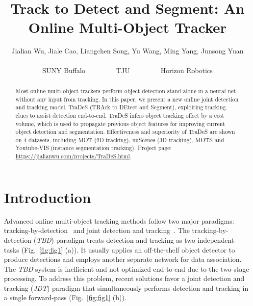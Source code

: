 \documentclass[final]{cvpr}
\begin{document}
\title{Track to Detect and Segment: An Online Multi-Object Tracker}
\author{Jialian Wu, Jiale Cao, Liangchen Song, Yu Wang, Ming Yang, Junsong Yuan\\\\
	SUNY Buffalo~~~~~~~~~TJU~~~~~~~~~Horizon Robotics
}

\maketitle
\begin{abstract}
Most online multi-object trackers perform object detection stand-alone in a neural net without any input from tracking. In this paper, we present a new online joint detection and tracking model, TraDeS (TRAck to DEtect and Segment), exploiting tracking clues to assist detection end-to-end. TraDeS infers object tracking offset by a cost volume, which is used to propagate previous object features for improving current object detection and segmentation. Effectiveness and superiority of TraDeS are shown on 4 datasets, including MOT (2D tracking), nuScenes (3D tracking), MOTS and Youtube-VIS (instance segmentation tracking). Project page: \url{https://jialianwu.com/projects/TraDeS.html}.
\end{abstract}

\section{Introduction}
Advanced online multi-object tracking methods follow two major paradigms: tracking-by-detection~\cite{bewley2016simple,tang2017multiple,milan1603mot16,xu2019spatial,Porzi_2020_CVPR,wojke2017simple} and joint detection and tracking~\cite{meinhardt2021trackformer,CenterTrack,tracktor,CTacker,wang2019towards,lu2020retinatrack,wang2020combining,wang2020joint}. The tracking-by-detection (\emph{TBD}) paradigm treats detection and tracking as two independent tasks (Fig.~\ref{fig:fig1} (a)). It usually applies an off-the-shelf object detector to produce detections and employs another separate network for data association. The \emph{TBD} system is inefficient and not optimized end-to-end due to the two-stage processing. To address this problem, recent solutions favor a joint detection and tracking (\emph{JDT}) paradigm that simultaneously performs detection and tracking in a single forward-pass (Fig.~\ref{fig:fig1} (b)).
\end{document}

